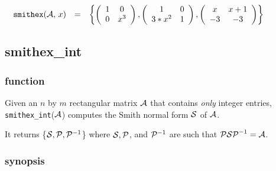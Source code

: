 \begin{displaymath}
\hspace{-0.5in}
\begin{array}{ccc}
{\tt smithex}({\cal A},\, x) & = & 
\left\{ \left( \begin{array}{cc} 1 & 0 \\ 
0 & x^3 \end{array} \right), \left( \begin{array}{cc} 1 & 0 \\ 3*x^2 
& 1 \end{array} \right), \left( \begin{array}{cc} x & x+1 \\ -3 & -3 
\end{array} \right) \right\} \end{array}
\end{displaymath}


\subsection{smithex\_int}

\subsubsection{function}

Given an $n$ by $m$ rectangular matrix ${\cal A}$ that contains 
{\it only} integer entries, {\tt smithex\_int}(${\cal A}$) computes the
Smith normal form ${\cal S}$ of ${\cal A}$.

It returns \{${\cal S}, {\cal P}, {\cal P}^{-1}$\} where ${\cal S}, 
{\cal P}$, and ${\cal P}^{-1}$ are such that ${\cal P S P}^{-1} = 
{\cal A}$.


\subsubsection{synopsis}

